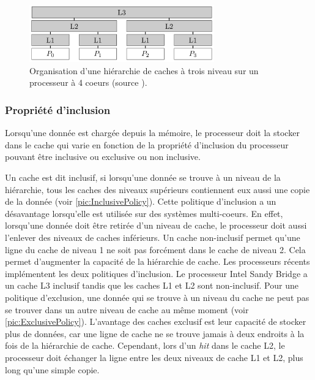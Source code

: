 \begin{figure}
    \center
    \includegraphics[width=8cm]{images/cache_hierarchy.png}
    \caption{\label{pic:cache_hierarchy} Organisation d'une hiérarchie de caches à trois niveau sur un processeur à 4 coeurs (source \cite{putigny2014benchmark}).}
\end{figure}




\subsubsection{Propriété d'inclusion}
Lorsqu'une donnée est chargée depuis la mémoire, le processeur doit la stocker dans le cache qui varie en fonction de la propriété d'inclusion du processeur pouvant être inclusive ou exclusive ou non inclusive.

Un cache est dit inclusif, si lorsqu'une donnée se trouve à un niveau de la hiérarchie, tous les caches des niveaux supérieurs contiennent eux aussi une copie de la donnée (voir \autoref{pic:InclusivePolicy}). Cette politique d'inclusion a un désavantage lorsqu'elle est utilisée sur des systèmes multi-coeurs. En effet, lorsqu'une donnée doit être retirée d'un niveau de cache, le processeur doit aussi l'enlever des niveaux de caches inférieurs.  Un cache non-inclusif permet qu'une ligne du cache de niveau 1 ne soit pas forcément dans le cache de niveau 2. Cela permet d'augmenter la capacité de la hiérarchie de cache. Les processeurs récents implémentent les deux politiques d'inclusion. Le processeur Intel Sandy Bridge a un cache L3 inclusif tandis que les caches L1 et L2 sont non-inclusif. Pour une politique d'exclusion, une donnée qui se trouve à un niveau du cache ne peut pas se trouver dans un autre niveau de cache au même moment (voir \autoref{pic:ExclusivePolicy}). L'avantage des caches exclusif est leur capacité de stocker plus de données, car une ligne de cache ne se trouve jamais à deux endroits à la fois de la hiérarchie de cache. Cependant, lors d'un \textit{hit} dans le cache L2, le processeur doit échanger la ligne entre les deux niveaux de cache L1 et L2, plus long qu'une simple copie.




